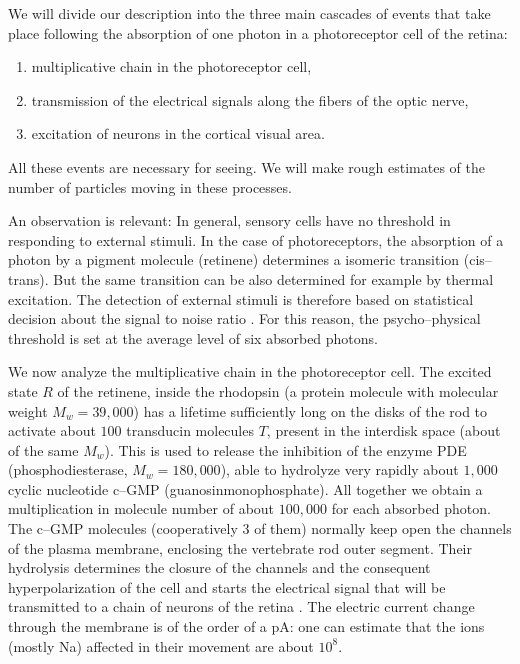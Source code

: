 \documentclass[10pt,a4paper]{article}
\begin{document}
We will divide our description into the three main cascades of
events that take place following the absorption of one photon in a
photoreceptor cell of the retina:
\begin{enumerate}
\item multiplicative chain in the photoreceptor cell,
\item transmission of the electrical signals along the fibers of
the optic nerve,
\item excitation of neurons in the cortical visual area.
\end{enumerate}
All these events are necessary for seeing. We will make rough
estimates of the number of particles moving in these processes.

An observation is relevant: In general, sensory cells have no
threshold in responding to external stimuli. In the case of
photoreceptors, the absorption of a photon by a pigment molecule
(retinene) determines a isomeric transition (cis--trans). But the
same transition can be also determined for example by thermal
excitation. The detection of external stimuli is therefore based
on statistical decision about the signal to noise ratio
\cite{bia}. For this reason, the psycho--physical threshold is set
at the average level of six absorbed photons.

We now analyze the multiplicative chain in the photoreceptor cell.
The excited state $R$ of the retinene, inside the rhodopsin (a
protein molecule with molecular weight $M_{w} = 39,000$) has a
lifetime sufficiently long on the disks of the rod to activate
about $100$ transducin molecules $T$, present in the interdisk
space (about of the same $M_{w}$). This is used to release the
inhibition of the enzyme PDE (phosphodiesterase, $M_{w} =
180,000$), able to hydrolyze very rapidly about $1,000$ cyclic
nucleotide c--GMP (guanosinmonophosphate). All together we obtain
a multiplication in molecule number of about $100,000$ for each
absorbed photon. The c--GMP molecules (cooperatively 3 of them)
normally keep open the channels of the plasma membrane, enclosing
the vertebrate rod outer segment. Their hydrolysis determines the
closure of the channels and the consequent hyperpolarization of
the cell and starts the electrical signal that will be transmitted
to a chain of neurons of the retina \cite{bpc}. The electric
current change through the membrane is of the order of a pA: one
can estimate that the ions (mostly Na) affected in their movement
are about $10^{8}$.
\end{document}

